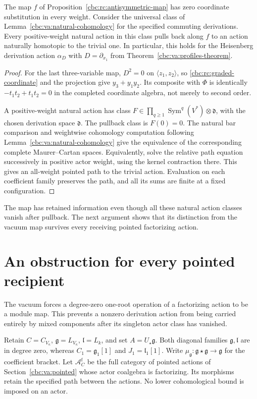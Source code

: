 \begin{proposition}\label{cbc:rc:invisible-action}
The map $f$ of Proposition~\ref{cbc:rc:antisymmetric-map}
has zero coordinate substitution in every weight.
Consider the universal class of Lemma~\ref{cbc:va:natural-cohomology}
for the specified commuting derivations. Every positive-weight natural
action in this class pulls back along $f$ to an action naturally
homotopic to the trivial one. In particular, this holds for the
Heisenberg derivation action $\alpha_D$ with
$D=\partial_{x_1}$ from
Theorem~\ref{cbc:va:profiles-theorem}.
\end{proposition}
\begin{proof}
For the last three-variable map, $D^2=0$ on
$\langle z_1,z_2\rangle$, so
\eqref{cbc:rc:graded-coordinate} and the projection
give $y_3+y_1y_2$.
Its composite with $\Phi$ is identically
$-t_1t_2+t_1t_2=0$ in the completed coordinate
algebra, not merely to second order.

A positive-weight natural action has class
$F\in\prod_{q\geq1}\operatorname{Sym}^q(V^*)
\otimes\mathfrak d$, with the chosen derivation
space $\mathfrak d$. The pullback class is
$F(0)=0$. The natural bar comparison and
weightwise cohomology computation following
Lemma~\ref{cbc:va:natural-cohomology} give the
equivalence of the corresponding complete
Maurer--Cartan spaces. Equivalently, solve the
relative path equation successively in positive
actor weight, using the kernel contraction
there. This gives an all-weight pointed path
to the trivial action. Evaluation on each
coefficient family preserves the path, and
all its sums are finite at a fixed configuration.
\end{proof}

The map has retained information even though
all these natural action classes vanish after
pullback. The next argument shows that its
distinction from the vacuum map survives every
receiving pointed factorizing action.

\section{An obstruction for every pointed recipient}
\label{cbc:rc:pointed-obstruction}

The vacuum forces a degree-zero one-root operation
of a factorizing action to be a module map. This
prevents a nonzero derivation action from being
carried entirely by mixed components after its
singleton actor class has vanished.

Retain $C=C_{V_\kappa}$, $\mathfrak g=L_{V_\kappa}$,
$\mathfrak l=L_k$, and set $A=U_\star\mathfrak g$.
Both diagonal families $\mathfrak g,\mathfrak l$
are in degree zero, whereas $C_1=\mathfrak g_1[1]$
and $J_1=\mathfrak l_1[1]$.
Write $\mu_{\mathfrak g}:\mathfrak g\star\mathfrak g\to\mathfrak g$
for the coefficient bracket.
Let $\mathscr A_C^{\mathrm f}$ be the full category
of pointed actions of Section~\ref{cbc:va:pointed}
whose actor coalgebra is factorizing. Its morphisms
retain the specified path between the actions.
No lower cohomological bound is imposed on an actor.

